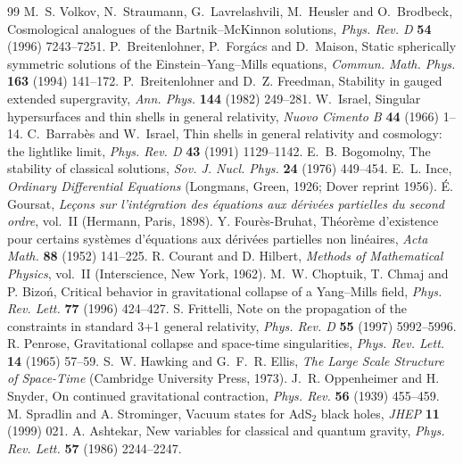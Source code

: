\begin{thebibliography}{99}
 M.~S. Volkov, N.~Straumann, G.~Lavrelashvili, M.~Heusler and O.~Brodbeck, Cosmological analogues of the Bartnik--McKinnon solutions, \emph{Phys. Rev. D} \textbf{54} (1996) 7243--7251.
 P.~Breitenlohner, P.~Forg\'acs and D.~Maison, Static spherically symmetric solutions of the Einstein--Yang--Mills equations, \emph{Commun. Math. Phys.} \textbf{163} (1994) 141--172.
 P.~Breitenlohner and D.~Z. Freedman, Stability in gauged extended supergravity, \emph{Ann. Phys.} \textbf{144} (1982) 249--281.
 W.~Israel, Singular hypersurfaces and thin shells in general relativity, \emph{Nuovo Cimento B} \textbf{44} (1966) 1--14.
 C.~Barrab\`es and W.~Israel, Thin shells in general relativity and cosmology: the lightlike limit, \emph{Phys. Rev. D} \textbf{43} (1991) 1129--1142.
 E.~B. Bogomolny, The stability of classical solutions, \emph{Sov. J. Nucl. Phys.} \textbf{24} (1976) 449--454.
 E.~L. Ince, \emph{Ordinary Differential Equations} (Longmans, Green, 1926; Dover reprint 1956).
 \'E. Goursat, \emph{Le\c{c}ons sur l'int\'egration des \'equations aux d\'eriv\'ees partielles du second ordre}, vol.~II (Hermann, Paris, 1898).
 Y. Four\`es-Bruhat, Th\'eor\`eme d'existence pour certains syst\`emes d'\'equations aux d\'eriv\'ees partielles non lin\'eaires, \emph{Acta Math.} \textbf{88} (1952) 141--225.
 R. Courant and D. Hilbert, \emph{Methods of Mathematical Physics}, vol.~II (Interscience, New York, 1962).
 M.~W. Choptuik, T. Chmaj and P. Bizo\'n, Critical behavior in gravitational collapse of a Yang--Mills field, \emph{Phys. Rev. Lett.} \textbf{77} (1996) 424--427.
 S. Frittelli, Note on the propagation of the constraints in standard 3+1 general relativity, \emph{Phys. Rev. D} \textbf{55} (1997) 5992--5996.
 R. Penrose, Gravitational collapse and space-time singularities, \emph{Phys. Rev. Lett.} \textbf{14} (1965) 57--59.
 S.~W. Hawking and G.~F.~R. Ellis, \emph{The Large Scale Structure of Space-Time} (Cambridge University Press, 1973).
 J.~R. Oppenheimer and H. Snyder, On continued gravitational contraction, \emph{Phys. Rev.} \textbf{56} (1939) 455--459.
 M. Spradlin and A. Strominger, Vacuum states for AdS$_2$ black holes, \emph{JHEP} \textbf{11} (1999) 021.
 A. Ashtekar, New variables for classical and quantum gravity, \emph{Phys. Rev. Lett.} \textbf{57} (1986) 2244--2247.

\end{thebibliography}
